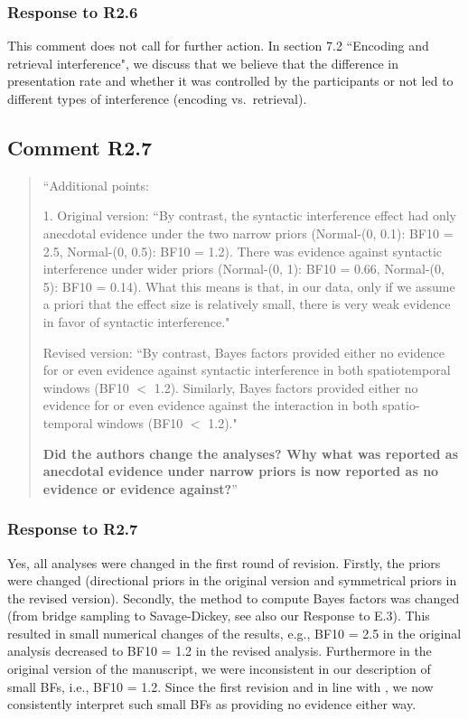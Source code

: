 \documentclass[12pt]{article}
\begin{document}
\subsubsection*{Response to R2.6}
This comment does not call for further action. In section 7.2 ``Encoding and retrieval interference", we discuss that we believe that the difference in presentation rate and whether it was controlled by the participants or not led to different types of interference (encoding vs.\ retrieval).
 
\subsection*{Comment R2.7}
\begin{quote}
``Additional points:

1. Original version: ``By contrast, the syntactic interference effect had only anecdotal evidence under the two narrow priors (Normal-(0, 0.1): BF10 = 2.5, Normal-(0, 0.5): BF10 = 1.2). There was evidence against syntactic interference under wider priors (Normal-(0, 1): BF10 = 0.66, Normal-(0, 5): BF10 = 0.14). What this means is that, in our data, only if we assume a priori that the effect size is relatively small, there is very weak evidence in favor of syntactic interference."

Revised version: ``By contrast, Bayes factors provided either no evidence for or even evidence against syntactic interference in both spatiotemporal windows (BF10 $<$ 1.2). Similarly, Bayes factors provided either no evidence for or even evidence against the interaction in both spatio-temporal windows (BF10 $<$ 1.2)."

\textbf{Did the authors change the analyses? Why what was reported as anecdotal evidence under narrow priors is now reported as no evidence or evidence against?}''
\end{quote}
\subsubsection*{Response to R2.7}
Yes, all analyses were changed in the first round of revision. Firstly, the priors were changed (directional priors in the original version and symmetrical priors in the revised version). Secondly, the method to compute Bayes factors was changed (from bridge sampling to Savage-Dickey, see also our Response to E.3). This resulted in small numerical changes of the results, e.g., BF10 = 2.5 in the original analysis decreased to BF10 = 1.2 in the revised analysis. Furthermore in the original version of the manuscript, we were inconsistent in our description of small BFs, i.e., BF10 = 1.2. Since the first revision and in line with \cite{lee2014bayesian}, we now consistently interpret such small BFs as providing no evidence either way.
\end{document}
